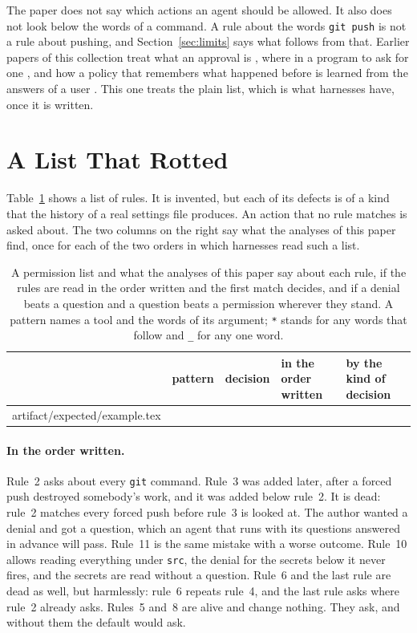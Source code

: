 \documentclass[acmsmall,nonacm,screen]{acmart}
\makeatletter
\newcommand{\rows}[1]{\@@input artifact/expected/#1.tex }
\makeatother
\begin{document}
The paper does not say which actions an agent should be allowed. It also does not look below
the words of a command. A rule about the words \texttt{git push} is not a rule about pushing,
and Section~\ref{sec:limits} says what follows from that. Earlier papers of this collection
treat what an approval is \citep{tpp4}, where in a program to ask for one \citep{tpp17}, and
how a policy that remembers what happened before is learned from the answers of a user
\citep{tpp16}. This one treats the plain list, which is what harnesses have, once it is
written.

\section{A List That Rotted}\label{sec:example}

Table~\ref{tab:example} shows a list of \exExampleRules{} rules. It is invented, but each of
its defects is of a kind that the history of a real settings file produces. An action that no
rule matches is asked about. The two columns on the right say what the analyses of this paper
find, once for each of the two orders in which harnesses read such a list.

\begin{table}
\caption{A permission list and what the analyses of this paper say about each rule, if the
rules are read in the order written and the first match decides, and if a denial beats a
question and a question beats a permission wherever they stand. A pattern names a tool and
the words of its argument; \texttt{*} stands for any words that follow and \texttt{\_} for
any one word.}\label{tab:example}
\begin{tabular}{rllll}
\toprule
 & pattern & decision & in the order written & by the kind of decision \\
\midrule
\rows{example}
\bottomrule
\end{tabular}
\end{table}

\paragraph{In the order written.} Rule~2 asks about every \texttt{git} command. Rule~3 was
added later, after a forced push destroyed somebody's work, and it was added below rule~2. It
is dead: rule~2 matches every forced push before rule~3 is looked at. The author wanted a
denial and got a question, which an agent that runs with its questions answered in advance
will pass. Rule~11 is the same mistake with a worse outcome. Rule~10 allows reading
everything under \texttt{src}, the denial for the secrets below it never fires, and the
secrets are read without a question. Rule~6 and the last rule are dead as well, but
harmlessly: rule~6 repeats rule~4, and the last rule asks where rule~2 already asks. Rules~5
and~8 are alive and change nothing. They ask, and without them the default would ask.
\end{document}
